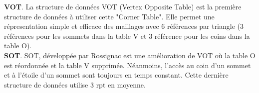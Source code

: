 \documentclass[a4paper,11pt,openany]{article}
\begin{document}
\noindent
\textbf{VOT}. La structure de données VOT (Vertex Opposite Table) est la première structure de données à utiliser cette "Corner Table". Elle permet une répresentation simple et efficace des maillages avec 6 références par triangle (3 références pour les sommets dans la table V et 3 référence pour les coins dans la table O).\\
\textbf{SOT}. SOT, développée par Rossignac \cite{SOT} est une amélioration de VOT où la table O est réordonnée et la table V supprimée. Néanmoins, l'accès au coin d'un sommet et à l'étoile d'un sommet sont toujours en temps constant. Cette dernière structure de données utilise 3 rpt en moyenne.


\end{document}
